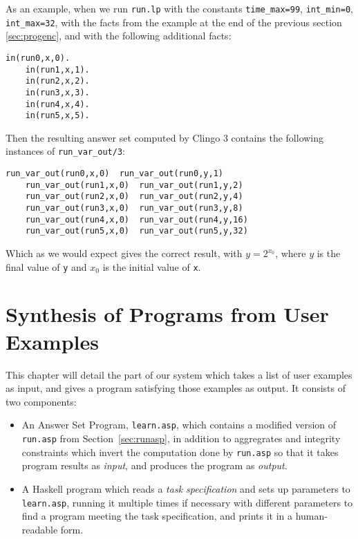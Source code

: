 \documentclass[a4paper,twoside,notitlepage]{report}
\begin{document}
As an example, when we run \verb|run.lp| with the constants 
\verb|time_max=99|, \verb|int_min=0|, \verb|int_max=32|, with the facts 
from the example at the end of the previous section \ref{sec:progenc},
and with the following additional facts:
\begin{Verbatim}[samepage=true]
    in(run0,x,0).
    in(run1,x,1).
    in(run2,x,2).
    in(run3,x,3).
    in(run4,x,4).
    in(run5,x,5).
\end{Verbatim}
Then the resulting answer set computed by Clingo 3 contains the following 
instances of \verb|run_var_out/3|:
\begin{Verbatim}[samepage=true]
    run_var_out(run0,x,0)  run_var_out(run0,y,1)
    run_var_out(run1,x,0)  run_var_out(run1,y,2)
    run_var_out(run2,x,0)  run_var_out(run2,y,4)
    run_var_out(run3,x,0)  run_var_out(run3,y,8)
    run_var_out(run4,x,0)  run_var_out(run4,y,16) 
    run_var_out(run5,x,0)  run_var_out(run5,y,32)
\end{Verbatim}
Which as we would expect gives the correct result, with $y = 2^{x_0}$, 
where $y$ is the final value of \verb|y| and $x_0$ is the initial value of 
\verb|x|.

\chapter{Synthesis of Programs from User Examples} \label{chp:synexm}

\begin{changebar}
This chapter will detail the part of our system which takes a list of user 
examples as input, and gives a program satisfying those examples as 
output. It consists of two components:
\begin{itemize}
    \item An Answer Set Program, \verb|learn.asp|, which contains a 
    modified version of \verb|run.asp| from Section~\ref{sec:runasp}, in 
    addition to aggregrates and integrity constraints which invert the 
    computation done by \verb|run.asp| so that it takes program results as 
    \emph{input}, and produces the program as \emph{output}.

    \item A Haskell program which reads a \emph{task specification} and 
    sets up parameters to \verb|learn.asp|, running it multiple times if 
    necessary with different parameters to find a program meeting the task 
    specification, and prints it in a human-readable form.
\end{itemize}
\end{changebar}
\end{document}
